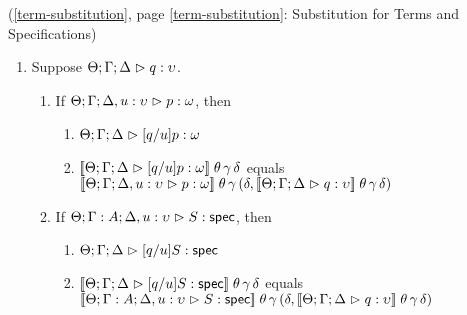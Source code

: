 \begin{lemma*}{(\ref{term-substitution}, page \ref{term-substitution}: Substitution for Terms and Specifications)}
\begin{enumerate}
\begin{enumerate}
        then 
        \begin{enumerate}
        \item $\judgeA[\Theta; \Gamma; \Delta]{[e/x]p}{\omega}$, 
        \item $\interp{\judgeA[\Theta; \Gamma; \Delta]{[e/x]p}{\omega}}\;\theta\,\gamma\,\delta$ equals \\
              $\interp{\judgeA[\Theta; \Gamma, x:A; \Delta]{p}{\omega}}\;\theta\,(\gamma, \interp{\judgeE{\Gamma}{e}{A}}\;\theta\;\gamma)\,\delta$               
        \end{enumerate}
  \item If $\judgeS[\Theta; \Gamma, x:A; \Delta]{S}$, 
        then 
        \begin{enumerate}
        \item $\judgeS[\Theta; \Gamma; \Delta]{[e/x]S}$.
        \item $\interp{\judgeS[\Theta; \Gamma; \Delta]{[e/x]S}}\;\theta\,\gamma\,\delta$ equals \\
              $\interp{\judgeS[\Theta; \Gamma, x:A; \Delta]{S}}\;\theta\,(\gamma, \interp{\judgeE{\Gamma}{e}{A}}\;\theta\;\gamma)\,\delta$
        \end{enumerate}
  \end{enumerate}
\item Suppose $\judgeA{q}{\upsilon}$.
  \begin{enumerate}
  \item If $\judgeA[\Theta; \Gamma; \Delta, u:\upsilon]{p}{\omega}$, 
        then 
        \begin{enumerate}
          \item $\judgeA[\Theta; \Gamma; \Delta]{[q/u]p}{\omega}$
          \item $\interp{\judgeA[\Theta; \Gamma; \Delta]{[q/u]p}{\omega}}\;\theta\,\gamma\,\delta$ equals \\
                $\interp{\judgeA[\Theta; \Gamma; \Delta, u:\upsilon]{p}{\omega}}\;\theta\,\gamma\,(\delta, \interp{\judgeA{q}{\upsilon}}\;\theta\,\gamma\,\delta)$
        \end{enumerate}
      \item If $\judgeS[\Theta; \Gamma:A; \Delta, u:\upsilon]{S}$, 
        then 
        \begin{enumerate}
          \item $\judgeS[\Theta; \Gamma; \Delta]{[q/u]S}$ 
          \item $\interp{\judgeS[\Theta; \Gamma; \Delta]{[q/u]S}}\;\theta\,\gamma\,\delta$ equals \\
                $\interp{\judgeS[\Theta; \Gamma:A; \Delta, u:\upsilon]{S}}\;\theta\,\gamma\,(\delta, \interp{\judgeA{q}{\upsilon}}\;\theta\,\gamma\,\delta)$
        \end{enumerate}
  \end{enumerate}

\end{enumerate}
\end{lemma*}
